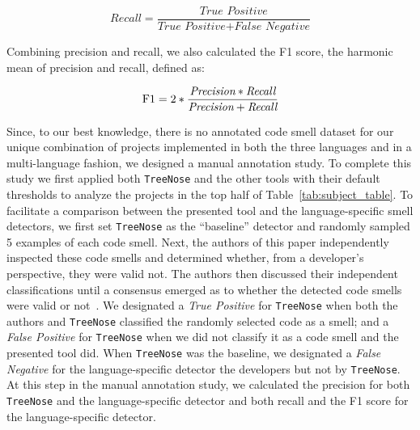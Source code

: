 \begin{equation}
    \textit{Recall} = \frac{\textit{True Positive}}{\textit{True Positive} + \textit{False Negative}}
\end{equation}

Combining precision and recall, we also calculated the F1 score, the harmonic
mean of precision and recall, defined as:

\begin{equation}
    \textnormal{F1} = 2 * \frac{\textit{Precision} * \textit{Recall}}{\textit{Precision} + \textit{Recall}}
\end{equation}



Since, to our best knowledge, there is no annotated code smell dataset for our
unique combination of projects implemented in both the three languages and in a
multi-language fashion, we designed a manual annotation study.
%
To complete this study we first applied both \texttt{TreeNose} and the other
tools with their default thresholds to analyze the projects in the top half of
Table~\ref{tab:subject_table}.
%
To facilitate a comparison between the presented tool and the language-specific
smell detectors, we first set \texttt{TreeNose} as the ``baseline'' detector
and randomly sampled 5 examples of each code smell.
%
Next, the authors of this paper independently inspected these code smells and
determined whether, from a developer's perspective, they were valid not.
%
The authors then discussed their independent classifications until a consensus
emerged as to whether the detected code smells were valid or
not~\cite{Cruzes2011}.
%
We designated a \textit{True Positive} for \texttt{TreeNose} when both the
authors and \texttt{TreeNose} classified the randomly selected code as a smell;
and a \textit{False Positive} for \texttt{TreeNose} when we did not classify it
as a code smell and the presented tool did.
%
When \texttt{TreeNose} was the baseline, we designated a \textit{False
Negative} for the language-specific detector the developers but not by
\texttt{TreeNose}.
%
At this step in the manual annotation study, we calculated the precision for
both \texttt{TreeNose} and the language-specific detector and both recall and
the F1 score for the language-specific detector.



